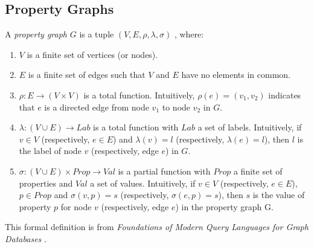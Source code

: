 \subsection{Property Graphs}
\label{subsec:property-graphs}

A \emph{property graph} $G$ is a tuple $(V, E, \rho, \lambda, \sigma)$ , where:

\begin{enumerate}[label=(\roman*)]
  \item $V$ is a finite set of vertices (or nodes).
  \item $E$ is a finite set of edges such that $V$ and $E$ have no elements in common.
  \item $\rho: E \to (V \times V)$ is a total function. Intuitively, $\rho(e) = (v_{1}, v_{2})$ indicates that $e$ is a directed edge from node $v_{1}$ to node $v_{2}$ in $G$.
  \item $\lambda: (V \cup E) \to Lab$  is a total function with $Lab$ a set of labels. Intuitively, if $v \in V$ (respectively, $e \in E$) and $\lambda(v) = l$ (respectively, $\lambda(e) = l$), then $l$ is the label of node $v$ (respectively, edge $e$) in $G$.
  \item $\sigma: (V \cup E) \times Prop \to Val$ is a partial function with $Prop$ a finite set of properties and $Val$ a set of values. Intuitively, if $v \in V$ (respectively, $e \in E$), $p \in Prop$ and $\sigma(v, p) = s$ (respectively, $\sigma(e,p) = s$), then $s$ is the value of property $p$ for node $v$ (respectively, edge $e$) in the property graph G.
\end{enumerate}

This formal definition is from \emph{Foundations of Modern Query Languages for Graph Databases} \cite{angles2017foundations}.
